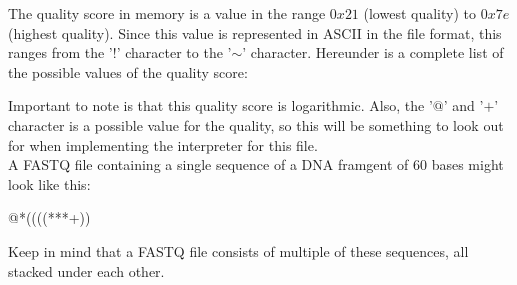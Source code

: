 The quality score in memory is a value in the range $0x21$ (lowest quality) to $0x7e$ (highest quality). Since this value is represented in ASCII in the file format, this ranges from the '$!$' character to the '$\mathtt{\sim}$' character. Hereunder is a complete list of the possible values of the quality score:

\begin{lcverbatim}
!"#$%
[\]^_`abcdefghijklmnopqrstuvwxyz{|}~
\end{lcverbatim}


Important to note is that this quality score is logarithmic. Also, the '$@$' and '$+$' character is a possible value for the quality, so this will be something to look out for when implementing the interpreter for this file.\\

	
A FASTQ file containing a single sequence of a DNA framgent of 60 bases might look like this:


\begin{lcverbatim}
@*((((***+))%
\end{lcverbatim}

Keep in mind that a FASTQ file consists of multiple of these sequences, all stacked under each other.
	
	
